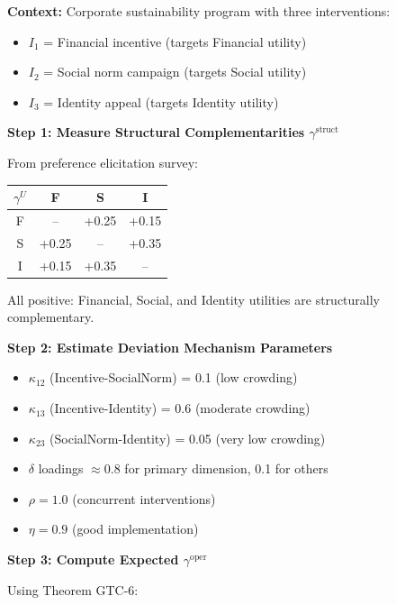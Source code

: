 \begin{tcolorbox}[colback=gray!5!white, colframe=gray!75!black,
    title=Worked Example: Are Our $\gamma$ Values Consistent?]

\textbf{Context:} Corporate sustainability program with three interventions:
\begin{itemize}[nosep]
    \item $I_1$ = Financial incentive (targets Financial utility)
    \item $I_2$ = Social norm campaign (targets Social utility)
    \item $I_3$ = Identity appeal (targets Identity utility)
\end{itemize}

\textbf{Step 1: Measure Structural Complementarities $\gamma^{\text{struct}}$}

From preference elicitation survey:
\begin{center}
\begin{tabular}{c|ccc}
$\gamma^U$ & F & S & I \\
\hline
F & -- & +0.25 & +0.15 \\
S & +0.25 & -- & +0.35 \\
I & +0.15 & +0.35 & -- \\
\end{tabular}
\end{center}

All positive: Financial, Social, and Identity utilities are structurally complementary.

\textbf{Step 2: Estimate Deviation Mechanism Parameters}

\begin{itemize}[nosep]
    \item $\kappa_{12}$ (Incentive-SocialNorm) = 0.1 (low crowding)
    \item $\kappa_{13}$ (Incentive-Identity) = 0.6 (moderate crowding)
    \item $\kappa_{23}$ (SocialNorm-Identity) = 0.05 (very low crowding)
    \item $\delta$ loadings $\approx 0.8$ for primary dimension, 0.1 for others
    \item $\rho = 1.0$ (concurrent interventions)
    \item $\eta = 0.9$ (good implementation)
\end{itemize}

\textbf{Step 3: Compute Expected $\gamma^{\text{oper}}$}

Using Theorem GTC-6:


\end{tcolorbox}
